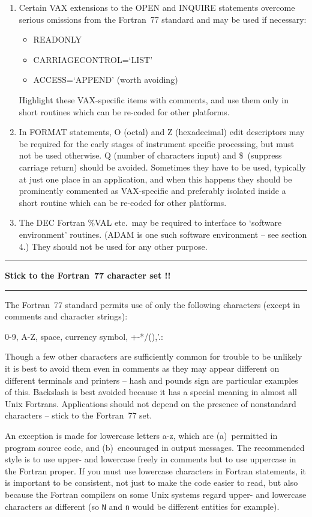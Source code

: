 \documentclass[twoside,11pt,nolof,noabs]{starlink}
\newcounter{sruleno}
\providecommand{\srule}[1]{
    \addtocounter{sruleno}{1}
    \goodbreak
    \rule{\textwidth}{0.3mm}
    \textbf{#1} \scpushright{ \textbf{\thesruleno}}
    \rule{\textwidth}{0.1mm}
}
\renewcommand{\_}{{\tt\char'137}}
\begin{document}
\begin{enumerate}
\item Certain VAX extensions to the OPEN and INQUIRE statements
overcome serious
omissions from the Fortran~77 standard and may be used if necessary:
\begin{itemize}
\item READONLY
\item CARRIAGECONTROL=`LIST'
\item ACCESS=`APPEND' (worth avoiding)
\end{itemize}
Highlight these
VAX-specific items with comments, and use them only in short routines
which can be re-coded for other platforms.

\item In FORMAT statements, O (octal) and Z (hexadecimal) edit descriptors may
be required for the early stages of instrument specific processing, but must not
be used otherwise.  Q (number of characters input) and \$\ (suppress
carriage return) should be avoided.  Sometimes they have to be
used, typically at just one place in an application, and when this
happens they should be prominently commented as VAX-specific and
preferably isolated inside a short routine which can be re-coded
for other platforms.

\item The DEC Fortran \%VAL etc.\ may be required to interface to `software
environment' routines.
(ADAM is one such software environment -- see section 4.)
They should not be used for any other purpose.

\end{enumerate}

\srule{Stick to the Fortran~77 character set !!}
The Fortran~77 standard permits use of only the following characters
(except in comments and character strings):
\begin{terminalv}
    0-9, A-Z, space, currency symbol, +-*/(),'.:
\end{terminalv}
Though a few other characters are sufficiently common for trouble to be unlikely
it is best to avoid them even in comments as they may appear different on
different terminals and printers -- hash and pounds sign are particular
examples of this.  Backslash is best avoided because it has a special
meaning in almost all Unix Fortrans.
Applications should not depend on the presence of nonstandard characters --
stick to the Fortran~77 set.

An exception is made for lowercase letters
a-z, which are (a)~permitted in program
source code, and (b)~encouraged in output messages.
The recommended style is to use upper- and lowercase
freely in comments but to use uppercase in the Fortran proper.
If you must use lowercase characters in Fortran statements, it is
important to be consistent, not just to make the code easier to read,
but also because the Fortran compilers on some Unix systems regard
upper- and lowercase characters as different (so \verb|N| and \verb|n|
would be different entities for example).
\end{document}
